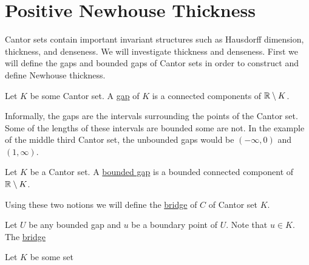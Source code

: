 \section{Positive Newhouse Thickness}
Cantor sets contain important invariant structures such as Hausdorff dimension, thickness, and denseness.  We will investigate thickness and denseness.  First we will define the gaps and bounded gaps of Cantor sets in order to construct and define Newhouse thickness. 
\begin{definition}[Gap]
    Let $K$ be some Cantor set.  A \underline{gap} of $K$ is a connected components of $\mathbb{R} \setminus K$.      
\end{definition}  Informally, the gaps are the intervals surrounding the points of the Cantor set.  Some of the lengths of these intervals are bounded some are not.  In the example of the middle third Cantor set, the unbounded gaps would be $(-\infty, 0)$ and $(1, \infty)$.  

\begin{definition}
    Let $K$ be a Cantor set.  A \underline{bounded gap} is a bounded connected component of $\mathbb{R} \setminus K$.      
\end{definition}

Using these two notions we will define the \underline{bridge} of $C$ of Cantor set $K$.  
\begin{definition}[bridge]
    Let $U$ be any bounded gap and $u$ be a boundary point of $U$.  Note that $u \in K$.  The \underline{bridge}    
\end{definition}

\begin{definition}
    Let $K$ be some set 
    
\end{definition}
